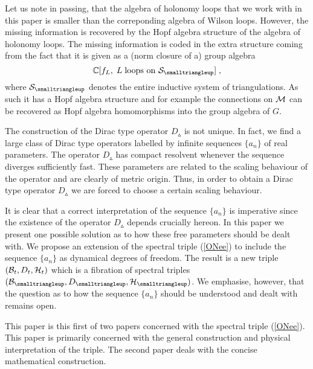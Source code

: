 \documentclass[12pt]{article}
\def\cb{{\cal B}}
\def\ch{{\cal H}}
\def\cm{{\cal M}}
\def\cs{{\cal S}}
\begin{document}
Let us note in passing, that the algebra of holonomy loops that we work with in this paper is smaller than the correponding algebra of Wilson loops. However, the missing information is recovered by the Hopf algebra structure of the algebra of holonomy loops. The missing information is coded in the extra structure coming from the fact that it is given as a (norm closure of a) group algebra
\[
\mathbb{C}[f_L,\;L \;\mbox{loops on } \cs_\smalltriangleup]\;,
\]
where $\cs_\smalltriangleup$ denotes the entire inductive system of triangulations.
As such it has a Hopf algebra structure and for example the connections on $\cm$ can be recovered as Hopf algebra homomorphisms into the group algebra of $G$.




The construction of the Dirac type operator $D_\smalltriangleup$ is not unique. In fact, we find a large class of Dirac type operators labelled by infinite sequences $\{a_n\}$ of real parameters. The operator $D_\smalltriangleup$ has compact resolvent whenever the sequence diverges sufficiently fast. These parameters are related to the scaling behaviour of the operator and are clearly of metric origin. Thus, in order to obtain a Dirac type operator $D_\smalltriangleup$ we are forced to choose a certain scaling behaviour. 


It is clear that a correct interpretation of the sequence $\{a_n\}$ is imperative since the existence of the operator $D_\smalltriangleup$ depends crucially hereon. 
In this paper we present one possible solution as to how these free parameters should be dealt with. We propose an extension of the spectral triple (\ref{ONee}) to include the sequence $\{a_n\}$ as dynamical degrees of freedom. The result is a new triple $(\cb_t,D_t,\ch_t)$ which is a fibration of spectral triples $(\cb_{\smalltriangleup},D_{\smalltriangleup},\ch_\smalltriangleup)$. We emphasise, however, that the question as to how the sequence $\{a_n\}$ should be understood and dealt with remains open.


This paper is this first of two papers concerned with the spectral triple (\ref{ONee}). This paper is primarily concerned with the general construction and physical interpretation of the triple. The second paper \cite{Aastrup} deals with the concise mathematical construction.
\end{document}
